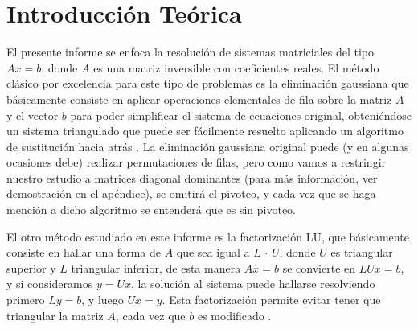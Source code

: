 \section{Introducción Teórica}
%
El presente informe se enfoca la resolución de sistemas matriciales del tipo $Ax=b$, donde $A$ es una matriz inversible con coeficientes reales. El método clásico por excelencia para este tipo de problemas es la eliminación gaussiana que básicamente consiste en aplicar operaciones elementales de fila sobre la matriz $A$ y el vector $b$ para poder simplificar el sistema de ecuaciones original, obteniéndose un sistema triangulado que puede ser fácilmente resuelto aplicando un algoritmo de sustitución hacia atrás \cite[6.1]{burden}. La eliminación gaussiana original puede (y en algunas ocasiones debe) realizar permutaciones de filas, pero como vamos a restringir nuestro estudio a matrices diagonal dominantes (para más información, ver demostración en el apéndice), se omitirá el pivoteo, y cada vez que se haga mención a dicho algoritmo se entenderá que es sin pivoteo.

El otro método estudiado en este informe es la factorización LU, que básicamente consiste en hallar una forma de $A$ que sea igual a $L$ $\cdot$ $U$, donde $U$ es triangular superior y $L$ triangular inferior, de esta manera $Ax=b$ se convierte en $LUx=b$, y si consideramos $y=Ux$, la solución al sistema puede hallarse resolviendo primero $Ly=b$, y luego $Ux=y$. Esta factorización permite evitar tener que triangular la matriz $A$, cada vez que $b$ es modificado \cite[6.5]{burden}.
